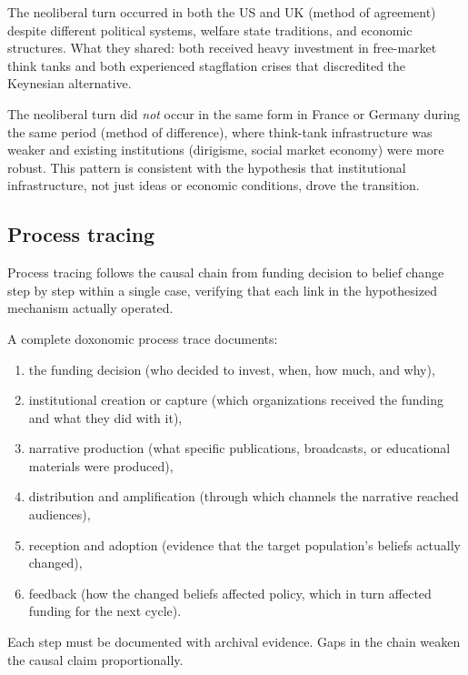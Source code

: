 \begin{example}
\label{ex:comparative-neoliberal}
The neoliberal turn occurred in both the US and UK (method of agreement) despite different political systems, welfare state traditions, and economic structures.
What they shared: both received heavy investment in free-market think tanks and both experienced stagflation crises that discredited the Keynesian alternative.

The neoliberal turn did \emph{not} occur in the same form in France or Germany during the same period (method of difference), where think-tank infrastructure was weaker and existing institutions (dirigisme, social market economy) were more robust.
This pattern is consistent with the hypothesis that institutional infrastructure, not just ideas or economic conditions, drove the transition.
\end{example}

\subsection{Process tracing}

Process tracing follows the causal chain from funding decision to belief change step by step within a single case, verifying that each link in the hypothesized mechanism actually operated.

\begin{model}
\label{mod:process-trace}
A complete doxonomic process trace documents:
\begin{enumerate}[nosep]
  \item the funding decision (who decided to invest, when, how much, and why),
  \item institutional creation or capture (which organizations received the funding and what they did with it),
  \item narrative production (what specific publications, broadcasts, or educational materials were produced),
  \item distribution and amplification (through which channels the narrative reached audiences),
  \item reception and adoption (evidence that the target population's beliefs actually changed),
  \item feedback (how the changed beliefs affected policy, which in turn affected funding for the next cycle).
\end{enumerate}
Each step must be documented with archival evidence.
Gaps in the chain weaken the causal claim proportionally.
\end{model}

